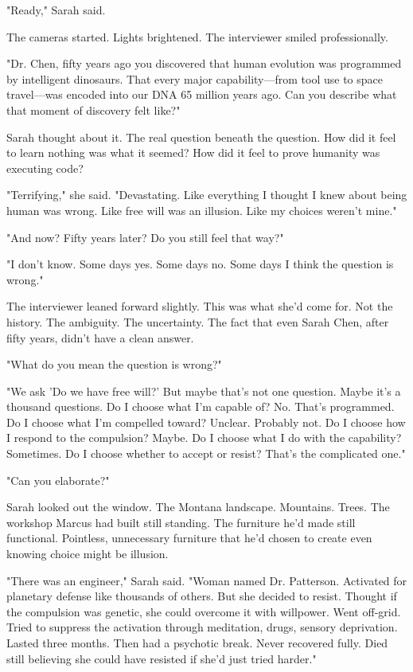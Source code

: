 "Ready," Sarah said.

The cameras started. Lights brightened. The interviewer smiled professionally.

"Dr. Chen, fifty years ago you discovered that human evolution was programmed by intelligent dinosaurs. That every major capability—from tool use to space travel—was encoded into our DNA 65 million years ago. Can you describe what that moment of discovery felt like?"

Sarah thought about it. The real question beneath the question. How did it feel to learn nothing was what it seemed? How did it feel to prove humanity was executing code?

"Terrifying," she said. "Devastating. Like everything I thought I knew about being human was wrong. Like free will was an illusion. Like my choices weren't mine."

"And now? Fifty years later? Do you still feel that way?"

"I don't know. Some days yes. Some days no. Some days I think the question is wrong."

The interviewer leaned forward slightly. This was what she'd come for. Not the history. The ambiguity. The uncertainty. The fact that even Sarah Chen, after fifty years, didn't have a clean answer.

"What do you mean the question is wrong?"

"We ask 'Do we have free will?' But maybe that's not one question. Maybe it's a thousand questions. Do I choose what I'm capable of? No. That's programmed. Do I choose what I'm compelled toward? Unclear. Probably not. Do I choose how I respond to the compulsion? Maybe. Do I choose what I do with the capability? Sometimes. Do I choose whether to accept or resist? That's the complicated one."

"Can you elaborate?"

Sarah looked out the window. The Montana landscape. Mountains. Trees. The workshop Marcus had built still standing. The furniture he'd made still functional. Pointless, unnecessary furniture that he'd chosen to create even knowing choice might be illusion.

"There was an engineer," Sarah said. "Woman named Dr. Patterson. Activated for planetary defense like thousands of others. But she decided to resist. Thought if the compulsion was genetic, she could overcome it with willpower. Went off-grid. Tried to suppress the activation through meditation, drugs, sensory deprivation. Lasted three months. Then had a psychotic break. Never recovered fully. Died still believing she could have resisted if she'd just tried harder."

